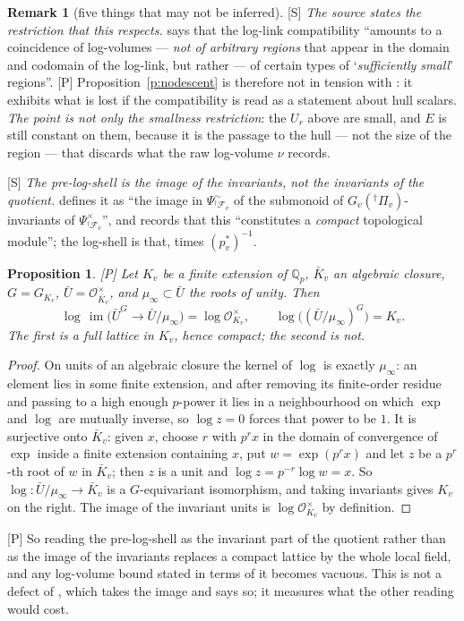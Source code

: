 \documentclass[11pt]{article}
\theoremstyle{plain}
\newtheorem{proposition}{Proposition}
\theoremstyle{definition}
\newtheorem{remark}{Remark}
\begin{document}
\begin{remark}[five things that may not be inferred]
\textup{[S]} \emph{The source states the restriction that this respects.}
\cite[Rem.~3.9.6]{IUT3} says that the log-link compatibility ``amounts to a
coincidence of log-volumes --- \emph{not of arbitrary regions} that appear in the
domain and codomain of the log-link, but rather --- of certain types of
`\emph{sufficiently small}' regions''.  \textup{[P]} Proposition~\ref{p:nodescent}
is therefore not in tension with \cite{IUT3}: it exhibits what is lost if the
compatibility is read as a statement about hull scalars.  \emph{The point is not only
the smallness restriction}: the $U_r$ above are small, and $E$ is still constant on
them, because it is the passage to the hull --- not the size of the region --- that
discards what the raw log-volume $\nu$ records.

\textup{[S]} \emph{The pre-log-shell is the image of the invariants, not the
invariants of the quotient.}  \cite[Def.~1.1(i)]{IUT3} defines it as ``the image in
$\Psi^{\sim}_{{}^\dagger\mathcal F_v}$ of the submonoid of
$G_v({}^\dagger\Pi_v)$-invariants of $\Psi^{\times}_{{}^\dagger\mathcal F_v}$'', and
records that this ``constitutes a \emph{compact} topological module''; the log-shell
is that, times $(p_v^{*})^{-1}$.

\begin{proposition}\label{p:invimg}
\textup{[P]} Let $K_v$ be a finite extension of $\mathbb{Q}_p$, $\bar K_v$ an
algebraic closure, $G=G_{K_v}$, $\bar U=\mathcal O_{\bar K_v}^{\times}$, and
$\mu_\infty\subset\bar U$ the roots of unity.  Then
\[
 \log\,\operatorname{im}\bigl(\bar U^{G}\to\bar U/\mu_\infty\bigr)
   =\log\mathcal O_{K_v}^{\times},
 \qquad
 \log\bigl((\bar U/\mu_\infty)^{G}\bigr)=K_v .
\]
The first is a full lattice in $K_v$, hence compact; the second is not.
\end{proposition}

\begin{proof}
On units of an algebraic closure the kernel of $\log$ is exactly $\mu_\infty$: an
element lies in some finite extension, and after removing its finite-order residue
and passing to a high enough $p$-power it lies in a neighbourhood on which $\exp$ and
$\log$ are mutually inverse, so $\log z=0$ forces that power to be $1$.  It is
surjective onto $\bar K_v$: given $x$, choose $r$ with $p^rx$ in the domain of
convergence of $\exp$ inside a finite extension containing $x$, put $w=\exp(p^rx)$
and let $z$ be a $p^r$-th root of $w$ in $\bar K_v$; then $z$ is a unit and
$\log z=p^{-r}\log w=x$.  So $\log:\bar U/\mu_\infty\to\bar K_v$ is a
$G$-equivariant isomorphism, and taking invariants gives $K_v$ on the right.  The
image of the invariant units is $\log\mathcal O_{K_v}^{\times}$ by definition.
\end{proof}

\textup{[P]} So reading the pre-log-shell as the invariant part of the quotient
rather than as the image of the invariants replaces a compact lattice by the whole
local field, and any log-volume bound stated in terms of it becomes vacuous.  This is
not a defect of \cite{IUT3}, which takes the image and says so; it measures what the
other reading would cost.
\end{remark}
\end{document}
